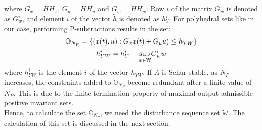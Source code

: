 \documentclass[letterpaper, 10 pt, conference]{ieeeconf}  %
\begin{document}
  where $G_x=\tilde{H}H_x$, $G_u=\tilde{H}H_u$ and $G_w=\tilde{H}H_w$.
  Row $i$ of the matrix $G_w$ is denoted as $G^i_w$, and element $i$ of the vector $\tilde{h}$ is denoted as $h_Y^i$.
   For polyhedral sets like in our case, performing P-subtractions results in the set:
  \begin{equation}
  \begin{matrix}
  \mathbb{O}_{N_P} = \{ (x(t),\bar{u}):G_xx(t)+G_u\bar{u})\leq h_{YW} \} \vspace{5pt} \\ 
  h_{YW}^i = h_Y^i-\underset{w\in \mathbb{W}}{\text{sup}} G_w^i w
  \end{matrix}
  \label{overall}
  \end{equation}
  where $h_{YW}^i$ is the element $i$ of the vector $h_{YW}$. If $A$ is Schur stable, as $N_P$ increases, the constraints added to $\mathbb{O}_{N_P}$ become redundant after a finite value of $N_P$. This is due to the finite-termination property of maximal output admissible positive invariant sets.
  \\
Hence, to calculate the set $\mathbb{O}_{N_P}$, we need the disturbance sequence set $\mathbb{W}$. The calculation of this set is discussed in the next section.
\end{document}
